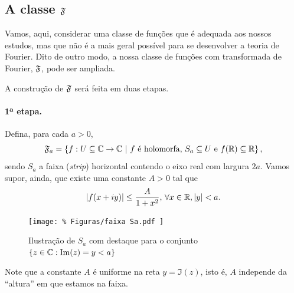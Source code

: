     \subsection{A classe \texorpdfstring{$\mathfrak{F}$}{F}}
        

        Vamos, aqui, considerar uma classe de funções que é adequada aos nossos estudos, mas
        que não é a mais geral possível para se desenvolver a teoria de Fourier. Dito de outro
        modo, a nossa classe de funções com transformada de Fourier, $\mathfrak{F}$, pode ser
        ampliada.
        
        A construção de $\mathfrak{F}$ será feita em duas etapas.
        
        \paragraph{1ª etapa.} Defina, para cada $a>0$,
        \begin{equation*}
            \F_a = \left\{ f:U\subseteq\C\to\C \ | \ 
            f \text{ é holomorfa, } S_a\subseteq U \text{ e } f(\R)\subseteq\R \right\},
        \end{equation*}
        sendo $S_a$ a faixa (\textit{strip}) horizontal contendo o eixo real com largura $2a$. Vamos supor, ainda,
        que existe uma constante $A>0$ tal que
        \begin{equation*}
            |f(x+iy)| \leq \frac{A}{1 + x^2}, \, \forall x\in\mathbb{R}, |y|<a.
        \end{equation*}
        \begin{figure}[H]\centering 
			\texttt{[image: \%
			    Figuras/faixa Sa.pdf
			]}
			\caption{%
			    Ilustração de $S_a$ com destaque para o conjunto 
			    $\{z\in\mathbb{C}: \mathrm{Im}(z)=y<a\}$
			}
		\end{figure}
        Note que a constante $A$ é uniforme na reta $y = \Im(z)$, isto é, $A$ independe da 
        ``altura'' em que estamos na faixa.
        
